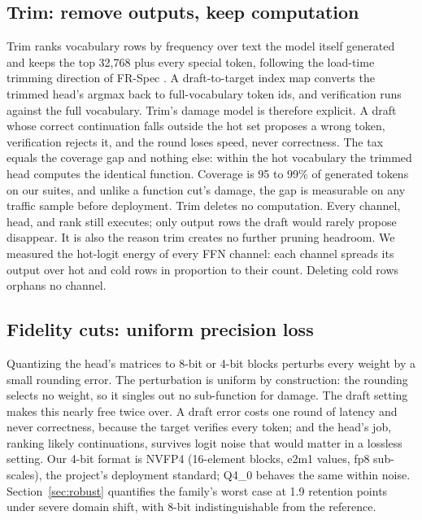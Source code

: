 \documentclass{article}
\begin{document}
\subsection{Trim: remove outputs, keep computation}
\label{sec:trim}

Trim ranks vocabulary rows by frequency over text the model itself generated and keeps the top 32,768 plus every special token, following the load-time trimming direction of FR-Spec \cite{zhao2025frspec}. A draft-to-target index map converts the trimmed head's argmax back to full-vocabulary token ids, and verification runs against the full vocabulary. Trim's damage model is therefore explicit. A draft whose correct continuation falls outside the hot set proposes a wrong token, verification rejects it, and the round loses speed, never correctness. The tax equals the coverage gap and nothing else: within the hot vocabulary the trimmed head computes the identical function. Coverage is 95 to 99\% of generated tokens on our suites, and unlike a function cut's damage, the gap is measurable on any traffic sample before deployment. Trim deletes no computation. Every channel, head, and rank still executes; only output rows the draft would rarely propose disappear. It is also the reason trim creates no further pruning headroom. We measured the hot-logit energy of every FFN channel: each channel spreads its output over hot and cold rows in proportion to their count. Deleting cold rows orphans no channel.

\subsection{Fidelity cuts: uniform precision loss}
\label{sec:fidelity}

Quantizing the head's matrices to 8-bit or 4-bit blocks perturbs every weight by a small rounding error. The perturbation is uniform by construction: the rounding selects no weight, so it singles out no sub-function for damage. The draft setting makes this nearly free twice over. A draft error costs one round of latency and never correctness, because the target verifies every token; and the head's job, ranking likely continuations, survives logit noise that would matter in a lossless setting. Our 4-bit format is NVFP4 (16-element blocks, e2m1 values, fp8 sub-scales), the project's deployment standard; Q4\_0 behaves the same within noise. Section~\ref{sec:robust} quantifies the family's worst case at 1.9 retention points under severe domain shift, with 8-bit indistinguishable from the reference.
\end{document}

